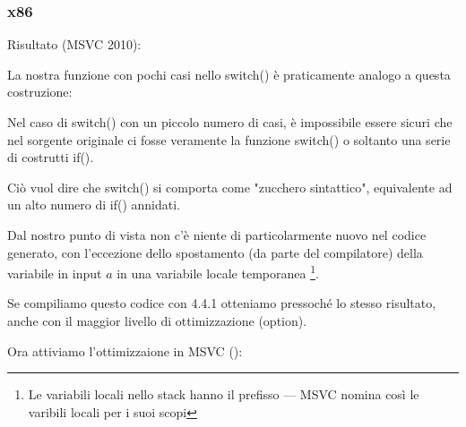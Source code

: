\subsubsection{x86}


Risultato (MSVC 2010):



La nostra funzione con pochi casi nello switch() è praticamente analogo a questa costruzione:




Nel caso di switch() con un piccolo numero di casi, è impossibile essere sicuri che nel sorgente originale ci fosse
veramente la funzione switch() o soltanto una serie di costrutti if().


\myindex{\SyntacticSugar}

Ciò vuol dire che switch() si comporta come "zucchero sintattico", equivalente ad un alto numero di if() annidati.

Dal nostro punto di vista non c'è niente di particolarmente nuovo nel codice generato,
con l'eccezione dello spostamento (da parte del compilatore) della variabile in input $a$ in una variabile locale temporanea 
\footnote{Le variabili locali nello stack hanno il prefisso --- MSVC nomina così le varibili locali per i suoi scopi}.

Se compiliamo questo codice con 4.4.1 otteniamo pressoché lo stesso risultato, anche con il maggior livello di ottimizzazione (\Othree option).


Ora attiviamo l'ottimizzaione in MSVC (\Ox): 

\label{JMP_instead_of_RET}


